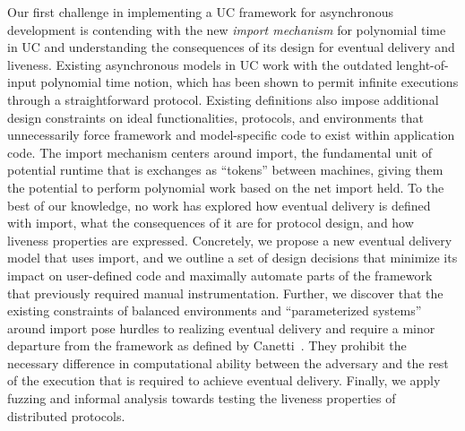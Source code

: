 Our first challenge in implementing a UC framework for asynchronous development is contending with the new \emph{import mechanism} for polynomial time in UC and understanding the consequences of its design for eventual delivery and liveness.
Existing asynchronous models in UC work with the outdated lenght-of-input polynomial time notion, which has been shown to permit infinite executions through a straightforward protocol.
Existing definitions also impose additional design constraints on ideal functionalities, protocols, and environments that unnecessarily force framework and model-specific code to exist within application code.
The import mechanism centers around import, the fundamental unit of potential runtime that is exchanges as ``tokens'' between machines, giving them the potential to perform polynomial work based on the net import held. 
To the best of our knowledge, no work has explored how eventual delivery is defined with import, what the consequences of it are for protocol design, and how liveness properties are expressed.
Concretely, we propose a new eventual delivery model that uses import, and we outline a set of design decisions that minimize its impact on user-defined code and maximally automate parts of the framework that previously required manual instrumentation.
Further, we discover that the existing constraints of balanced environments and ``parameterized systems'' around import pose hurdles to realizing eventual delivery and require a minor departure from the framework as defined by Canetti~\cite{uc}. 
They prohibit the necessary difference in computational ability between the adversary and the rest of the execution that is required to achieve eventual delivery.
Finally, we apply fuzzing and informal analysis towards testing the liveness properties of distributed protocols.


